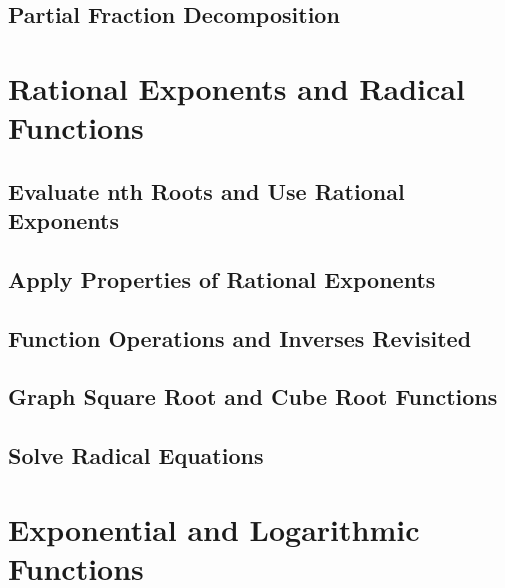 \documentclass[]{book}
\begin{document}
\hypertarget{partial-fraction-decomposition}{%
\section{Partial Fraction Decomposition}\label{partial-fraction-decomposition}}

\hypertarget{rational-exponents-and-radical-functions}{%
\chapter{Rational Exponents and Radical Functions}\label{rational-exponents-and-radical-functions}}

\hypertarget{evaluate-nth-roots-and-use-rational-exponents}{%
\section{Evaluate nth Roots and Use Rational Exponents}\label{evaluate-nth-roots-and-use-rational-exponents}}

\hypertarget{apply-properties-of-rational-exponents}{%
\section{Apply Properties of Rational Exponents}\label{apply-properties-of-rational-exponents}}

\hypertarget{function-operations-and-inverses-revisited}{%
\section{Function Operations and Inverses Revisited}\label{function-operations-and-inverses-revisited}}

\hypertarget{graph-square-root-and-cube-root-functions}{%
\section{Graph Square Root and Cube Root Functions}\label{graph-square-root-and-cube-root-functions}}

\hypertarget{solve-radical-equations}{%
\section{Solve Radical Equations}\label{solve-radical-equations}}

\hypertarget{exponential-and-logarithmic-functions}{%
\chapter{Exponential and Logarithmic Functions}\label{exponential-and-logarithmic-functions}}
\end{document}
